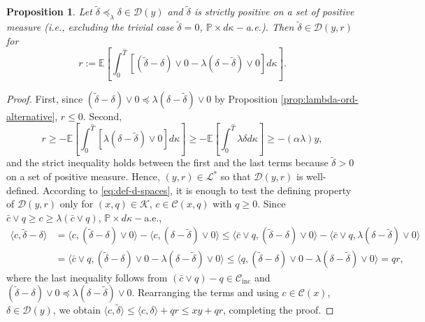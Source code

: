 \documentclass[11pt, oneside]{article}   	%
\theoremstyle{plain}
\newtheorem{prop}[thm]{Proposition}
\theoremstyle{definition}
\theoremstyle{remark}
\begin{document}
\begin{prop}\label{prop:sufficient-for-Dyr2}
Let $\tilde\delta\preceq_\lambda\delta\in\mathcal{D}(y)$ and $\tilde\delta$ is strictly positive on a set of positive measure (i.e., excluding the trivial case $\tilde\delta=0$, $\mathbb{P}\times d\kappa-$a.e.). Then $\tilde\delta\in\mathcal{D}(y,r)$ for
\begin{equation*}
r:=\mathbb{E}\left[\int_0^{\hat{T}} [(\tilde\delta-\delta)\vee 0-\lambda(\delta-\tilde\delta)\vee0] d\kappa\right].
\end{equation*}
\end{prop}
\begin{proof}
First, since $(\tilde\delta-\delta)\vee 0\preceq\lambda(\delta-\tilde\delta)\vee0$ by Proposition \ref{prop:lambda-ord-alternative}, $r\leq 0$. Second,
$$r\geq -\mathbb{E}\left[\int_0^{\hat{T}} [\lambda(\delta-\tilde\delta)\vee0] d\kappa\right]\geq -\mathbb{E}\left[\int_0^{\hat{T}} \lambda\delta d\kappa\right]\geq -(\alpha\lambda)y,$$
and the strict inequality holds between the first and the last terms because $\tilde\delta>0$ on a set of positive measure. Hence, $(y,r)\in\mathcal{L}^*$ so that $\mathcal{D}(y,r)$ is well-defined. According to \eqref{eq:def-d-spaces}, it is enough to test the defining property of $\mathcal{D}(y,r)$ only for $(x,q)\in\mathcal{K}$, $c\in\mathcal{C}(x,q)$ with $q\geq 0$.
Since $\bar{c}\vee q\geq c\geq \lambda(\bar{c}\vee q)$, $\mathbb{P}\times d\kappa-$a.e.,
\begin{equation*}
\begin{aligned}
\langle c,\tilde\delta-\delta\rangle&=\langle c,(\tilde\delta-\delta)\vee 0\rangle-\langle c,(\delta-\tilde\delta)\vee 0\rangle\leq \langle \bar{c}\vee q,(\tilde\delta-\delta)\vee 0\rangle-\langle \bar{c}\vee q,\lambda(\delta-\tilde\delta)\vee 0\rangle\\
&=\langle \bar{c}\vee q,(\tilde\delta-\delta)\vee 0-\lambda(\delta-\tilde\delta)\vee0\rangle\leq \langle q, (\tilde\delta-\delta)\vee 0-\lambda(\delta-\tilde\delta)\vee0\rangle=qr,
\end{aligned}
\end{equation*}
where the last inequality follows from $(\bar{c}\vee q)-q\in\mathcal{C}_{\text{inc}}$ and $(\tilde\delta-\delta)\vee 0\preceq\lambda(\delta-\tilde\delta)\vee0$. Rearranging the terms and using $c\in\mathcal{C}(x)$, $\delta\in\mathcal{D}(y)$, we obtain $\langle c,\tilde\delta\rangle\leq\langle c,\delta\rangle+qr\leq xy+qr$, completing the proof.
\end{proof}
\end{document}
